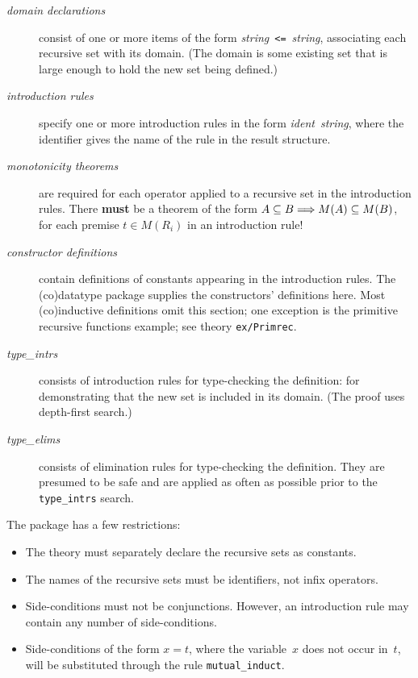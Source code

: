 \begin{description}
\item[\it domain declarations] consist of one or more items of the form
  {\it string\/}~{\tt <=}~{\it string}, associating each recursive set with
  its domain.  (The domain is some existing set that is large enough to
  hold the new set being defined.)

\item[\it introduction rules] specify one or more introduction rules in
  the form {\it ident\/}~{\it string}, where the identifier gives the name of
  the rule in the result structure.

\item[\it monotonicity theorems] are required for each operator applied to
  a recursive set in the introduction rules.  There \textbf{must} be a theorem
  of the form $A\subseteq B\Longrightarrow M(A)\subseteq M(B)$, for each premise $t\in M(R_i)$
  in an introduction rule!

\item[\it constructor definitions] contain definitions of constants
  appearing in the introduction rules.  The (co)datatype package supplies
  the constructors' definitions here.  Most (co)inductive definitions omit
  this section; one exception is the primitive recursive functions example;
  see theory \texttt{ex/Primrec}.
  
\item[\it type\_intrs] consists of introduction rules for type-checking the
  definition: for demonstrating that the new set is included in its domain.
  (The proof uses depth-first search.)

\item[\it type\_elims] consists of elimination rules for type-checking the
  definition.  They are presumed to be safe and are applied as often as
  possible prior to the {\tt type\_intrs} search.
\end{description}

The package has a few restrictions:
\begin{itemize}
\item The theory must separately declare the recursive sets as
  constants.

\item The names of the recursive sets must be identifiers, not infix
operators.  

\item Side-conditions must not be conjunctions.  However, an introduction rule
may contain any number of side-conditions.

\item Side-conditions of the form $x=t$, where the variable~$x$ does not
  occur in~$t$, will be substituted through the rule \verb|mutual_induct|.
\end{itemize}


